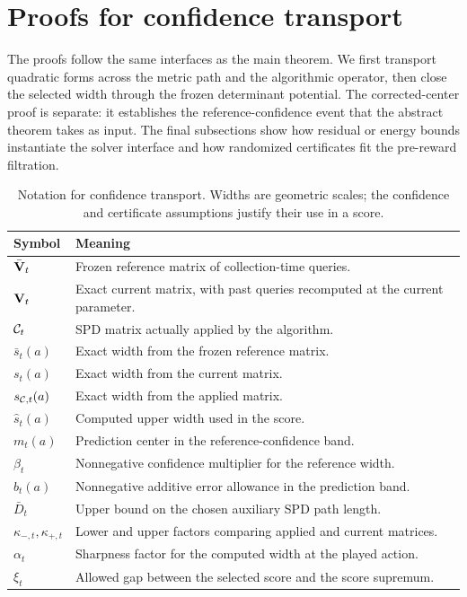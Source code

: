 \section{Proofs for confidence transport}
\label{app:transport-proofs}

The proofs follow the same interfaces as the main theorem.  We first transport
quadratic forms across the metric path and the algorithmic operator, then close
the selected width through the frozen determinant potential.  The
corrected-center proof is separate: it establishes the reference-confidence
event that the abstract theorem takes as input.  The final subsections show how
residual or energy bounds instantiate the solver interface and how randomized
certificates fit the pre-reward filtration.

\setcounter{table}{0}
\renewcommand{\thetable}{\thesection.\arabic{table}}
\renewcommand{\theHtable}{\thesection.\arabic{table}}

\begin{table}[t]
\caption{Notation for confidence transport.  Widths are geometric scales;
the confidence and certificate assumptions justify their use in a score.}
\label{tab:transport-notation}
\centering
\begin{tabularx}{\columnwidth}{@{}p{}X@{}}
\toprule
Symbol & Meaning \\
\midrule
$\bar{\mathbf{V}}_t$ & Frozen reference matrix of collection-time queries. \\
$\mathbf{V}_t$ & Exact current matrix, with past queries recomputed at the current parameter. \\
$\mathcal{C}_t$ & SPD matrix actually applied by the algorithm. \\
\midrule
$\bar s_t(a)$ & Exact width from the frozen reference matrix. \\
$s_t(a)$ & Exact width from the current matrix. \\
$s_{\mathcal{C},t}(a)$ & Exact width from the applied matrix. \\
$\hat s_t(a)$ & Computed upper width used in the score. \\
\midrule
$m_t(a)$ & Prediction center in the reference-confidence band. \\
$\beta_t$ & Nonnegative confidence multiplier for the reference width. \\
$b_t(a)$ & Nonnegative additive error allowance in the prediction band. \\
$\bar D_t$ & Upper bound on the chosen auxiliary SPD path length. \\
$\kappa_{-,t},\kappa_{+,t}$ & Lower and upper factors comparing applied and current matrices. \\
$\alpha_t$ & Sharpness factor for the computed width at the played action. \\
$\xi_t$ & Allowed gap between the selected score and the score supremum. \\
\bottomrule
\end{tabularx}
\end{table}

